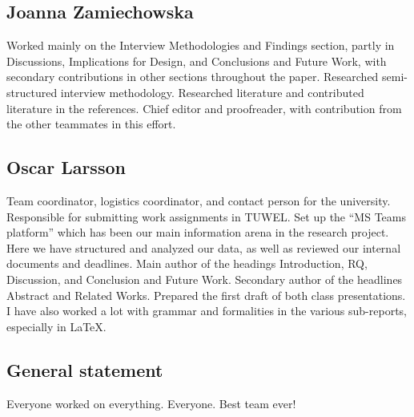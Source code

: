 \subsection{Joanna Zamiechowska}

Worked mainly on the Interview Methodologies and Findings section, partly in Discussions, Implications for Design, and Conclusions and Future Work, with secondary contributions in other sections throughout the paper. Researched semi-structured interview methodology. Researched literature and contributed literature in the references. Chief editor and proofreader, with contribution from the other teammates in this effort. 

\subsection{Oscar Larsson}

Team coordinator, logistics coordinator, and contact person for the university. Responsible for submitting work assignments in TUWEL. Set up the “MS Teams platform” which has been our main information arena in the research project. Here we have structured and analyzed our data, as well as reviewed our internal documents and deadlines. Main author of the headings Introduction, RQ, Discussion, and Conclusion and Future Work. Secondary author of the headlines Abstract and Related Works. Prepared the first draft of both class presentations. I have also worked a lot with grammar and formalities in the various sub-reports, especially in LaTeX. 

\subsection{General statement} 
Everyone worked on everything. Everyone. Best team ever! 